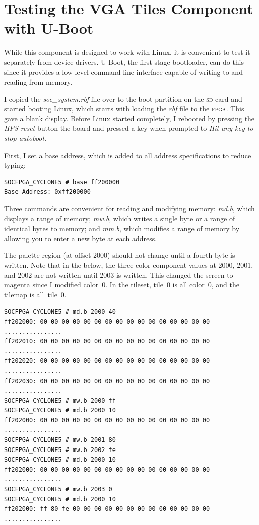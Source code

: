 \documentclass[11pt]{article}
\begin{document}

\section{Testing the VGA Tiles Component with U-Boot}

While this component is designed to work with Linux, it is convenient
to test it separately from device drivers.  U-Boot, the first-stage
bootloader, can do this since it provides a low-level command-line
interface capable of writing to and reading from memory.

I copied the \emph{soc\_system.rbf} file over to the boot partition on
the \textsc{sd} card and started booting Linux, which starts with
loading the \emph{rbf} file to the \textsc{fpga}.  This gave a blank
display.  Before Linux started completely, I rebooted by pressing the
\emph{HPS reset} button the board and pressed a key when prompted to
\emph{Hit any key to stop autoboot}.

First, I set a base address, which is added to all address
specifications to reduce typing:

{\footnotesize 
\begin{verbatim}
SOCFPGA_CYCLONE5 # base ff200000 
Base Address: 0xff200000
\end{verbatim}
}

Three commands are convenient for reading and modifying memory:
\emph{md.b}, which displays a range of memory; \emph{mw.b}, which
writes a single byte or a range of identical bytes to memory; and
\emph{mm.b}, which modifies a range of memory by allowing you to enter
a new byte at each address.

The palette region (at offset 2000) should not change until a fourth
byte is written.  Note that in the below, the three color component
values at 2000, 2001, and 2002 are not written until 2003 is written.
This changed the screen to magenta since I modified color~0.  In the
tileset, tile~0 is all color~0, and the tilemap is all~tile~0.

{\footnotesize 
\begin{verbatim}
SOCFPGA_CYCLONE5 # md.b 2000 40 
ff202000: 00 00 00 00 00 00 00 00 00 00 00 00 00 00 00 00    ................
ff202010: 00 00 00 00 00 00 00 00 00 00 00 00 00 00 00 00    ................
ff202020: 00 00 00 00 00 00 00 00 00 00 00 00 00 00 00 00    ................
ff202030: 00 00 00 00 00 00 00 00 00 00 00 00 00 00 00 00    ................
SOCFPGA_CYCLONE5 # mw.b 2000 ff 
SOCFPGA_CYCLONE5 # md.b 2000 10
ff202000: 00 00 00 00 00 00 00 00 00 00 00 00 00 00 00 00    ................
SOCFPGA_CYCLONE5 # mw.b 2001 80 
SOCFPGA_CYCLONE5 # mw.b 2002 fe
SOCFPGA_CYCLONE5 # md.b 2000 10
ff202000: 00 00 00 00 00 00 00 00 00 00 00 00 00 00 00 00    ................
SOCFPGA_CYCLONE5 # mw.b 2003 0
SOCFPGA_CYCLONE5 # md.b 2000 10 
ff202000: ff 80 fe 00 00 00 00 00 00 00 00 00 00 00 00 00    ................
\end{verbatim}
}
\end{document}

